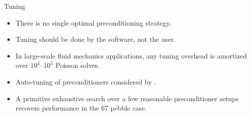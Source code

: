 \begin{frame}{Tuning}
  \begin{itemize}
    \item There is no single optimal preconditioning strategy.
    \item Tuning should be done by the software, not the user.
    \item In large-scale fluid mechanics applications, any tuning overhead is amortized over $10^4$--$10^5$ Poisson solves.
    \item Auto-tuning of preconditioners considered by \cite{imakura_auto-tuning_2012,yamada2018preconditioner,brown_tuning_2021}.
    \item A primitive exhaustive search over a few reasonable preconditioner setups recovers performance in the 67 pebble case.
  \end{itemize}
\end{frame}